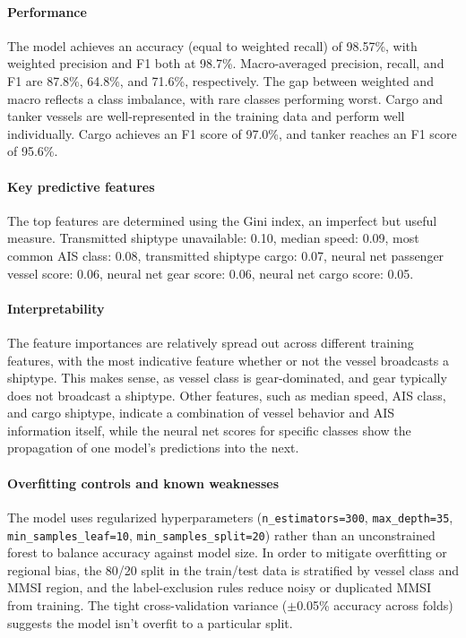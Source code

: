 \documentclass[lineno,pdflatex,sn-nature]{sn-jnl}
\begin{document}
\paragraph{Performance}
The model achieves an accuracy (equal to weighted recall) of 98.57\%, with weighted precision and F1 both at 98.7\%. Macro-averaged precision, recall, and F1 are 87.8\%, 64.8\%, and 71.6\%, respectively. The gap between weighted and macro reflects a class imbalance, with rare classes performing worst.
Cargo and tanker vessels are well-represented in the training data and perform well individually. Cargo achieves an F1 score of 97.0\%, and tanker reaches an F1 score of 95.6\%.

\paragraph{Key predictive features}
The top features are determined using the Gini index, an imperfect but useful measure. Transmitted shiptype unavailable: 0.10, median speed: 0.09, most common AIS class: 0.08, transmitted shiptype cargo: 0.07, neural net passenger vessel score: 0.06, neural net gear score: 0.06, neural net cargo score: 0.05.

\paragraph{Interpretability}
The feature importances are relatively spread out across different training features, with the most indicative feature whether or not the vessel broadcasts a shiptype. This makes sense, as vessel class is gear-dominated, and gear typically does not broadcast a shiptype. Other features, such as median speed, AIS class, and cargo shiptype, indicate a combination of vessel behavior and AIS information itself, while the neural net scores for specific classes show the propagation of one model's predictions into the next.


\paragraph{Overfitting controls and known weaknesses}
The model uses regularized hyperparameters (\texttt{n\_estimators=300}, \texttt{max\_depth=35}, \texttt{min\_samples\_leaf=10}, \texttt{min\_samples\_split=20}) rather than an unconstrained forest to balance accuracy against model size. In order to mitigate overfitting or regional bias, the 80/20 split in the train/test data is stratified by vessel class and MMSI region, and the label-exclusion rules reduce noisy or duplicated MMSI from training. The tight cross-validation variance ($±$0.05\% accuracy across folds) suggests the model isn’t overfit to a particular split.
\end{document}
